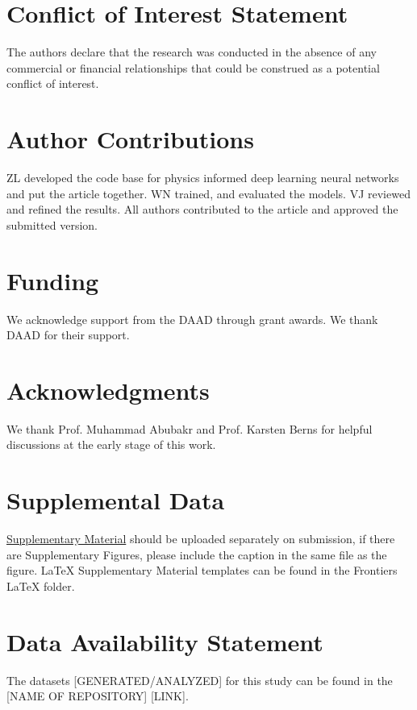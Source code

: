 \documentclass[AMA,STIX1COL]{WileyNJD-v2}
\begin{document}
\maketitle







\section*{Conflict of Interest Statement}

The authors declare that the research was conducted in the absence of any commercial or financial relationships that could be construed as a potential conflict of interest.

\section*{Author Contributions}
ZL developed the code base for physics informed deep learning neural networks and put the article together. WN trained, and evaluated the models. VJ reviewed and refined the results. All authors contributed to the article and approved the submitted version.
\section*{Funding}
We acknowledge support from the DAAD through grant awards. We thank DAAD for their support.

\section*{Acknowledgments}
We thank Prof. Muhammad Abubakr and Prof. Karsten Berns for helpful discussions at the early stage of this work.

\section*{Supplemental Data}
 \href{http://home.frontiersin.org/about/author-guidelines#SupplementaryMaterial}{Supplementary Material} should be uploaded separately on submission, if there are Supplementary Figures, please include the caption in the same file as the figure. LaTeX Supplementary Material templates can be found in the Frontiers LaTeX folder.

\section*{Data Availability Statement}
The datasets [GENERATED/ANALYZED] for this study can be found in the [NAME OF REPOSITORY] [LINK].


%

\end{document}
